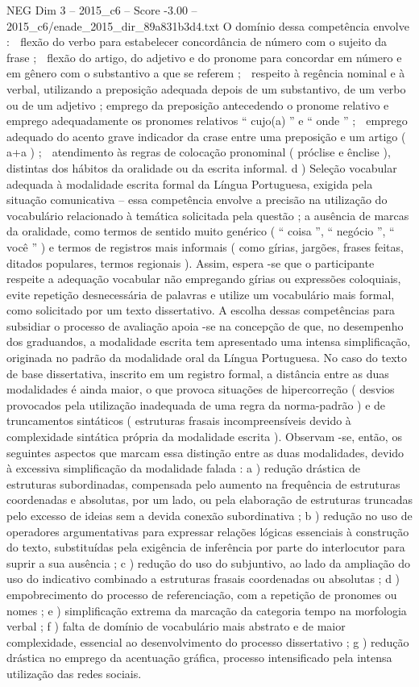 \begin{textsample}{NEG Dim 3 – 2015\_c6 – Score -3.00 – 2015\_c6/enade\_2015\_dir\_89a831b3d4.txt}
O domínio dessa competência envolve :  flexão do verbo para estabelecer concordância de número com o sujeito da frase ;  flexão do artigo, do adjetivo e do pronome para concordar em número e em gênero com o substantivo a que se referem ;  respeito à regência nominal e à verbal, utilizando a preposição adequada depois de um substantivo, de um verbo ou de um adjetivo ; emprego da preposição antecedendo o pronome relativo e emprego adequadamente os pronomes relativos “ cujo(a) ” e “ onde ” ;  emprego adequado do acento grave indicador da crase entre uma preposição e um artigo ( a+a ) ;  atendimento às regras de colocação pronominal ( próclise e ênclise ), distintas dos hábitos da oralidade ou da escrita informal. d ) Seleção vocabular adequada à modalidade escrita formal da Língua Portuguesa, exigida pela situação comunicativa – essa competência envolve a precisão na utilização do vocabulário relacionado à temática solicitada pela questão ; a ausência de marcas da oralidade, como termos de sentido muito genérico ( “ coisa ”, “ negócio ”, “ você ” ) e termos de registros mais informais ( como gírias, jargões, frases feitas, ditados populares, termos regionais ).
Assim, espera -se que o participante respeite a adequação vocabular não empregando gírias ou expressões coloquiais, evite repetição desnecessária de palavras e utilize um vocabulário mais formal, como solicitado por um texto dissertativo.
A escolha dessas competências para subsidiar o processo de avaliação apoia -se na concepção de que, no desempenho dos graduandos, a modalidade escrita tem apresentado uma intensa simplificação, originada no padrão da modalidade oral da Língua Portuguesa.
No caso do texto de base dissertativa, inscrito em um registro formal, a distância entre as duas modalidades é ainda maior, o que provoca situações de hipercorreção ( desvios provocados pela utilização inadequada de uma regra da norma-padrão ) e de truncamentos sintáticos ( estruturas frasais incompreensíveis devido à complexidade sintática própria da modalidade escrita ).
Observam -se, então, os seguintes aspectos que marcam essa distinção entre as duas modalidades, devido à excessiva simplificação da modalidade falada : a ) redução drástica de estruturas subordinadas, compensada pelo aumento na frequência de estruturas coordenadas e absolutas, por um lado, ou pela elaboração de estruturas truncadas pelo excesso de ideias sem a devida conexão subordinativa ; b ) redução no uso de operadores argumentativas para expressar relações lógicas essenciais à construção do texto, substituídas pela exigência de inferência por parte do interlocutor para suprir a sua ausência ; c ) redução do uso do subjuntivo, ao lado da ampliação do uso do indicativo combinado a estruturas frasais coordenadas ou absolutas ; d ) empobrecimento do processo de referenciação, com a repetição de pronomes ou nomes ; e ) simplificação extrema da marcação da categoria tempo na morfologia verbal ; f ) falta de domínio de vocabulário mais abstrato e de maior complexidade, essencial ao desenvolvimento do processo dissertativo ; g ) redução drástica no emprego da acentuação gráfica, processo intensificado pela intensa utilização das redes sociais.

\end{textsample}
